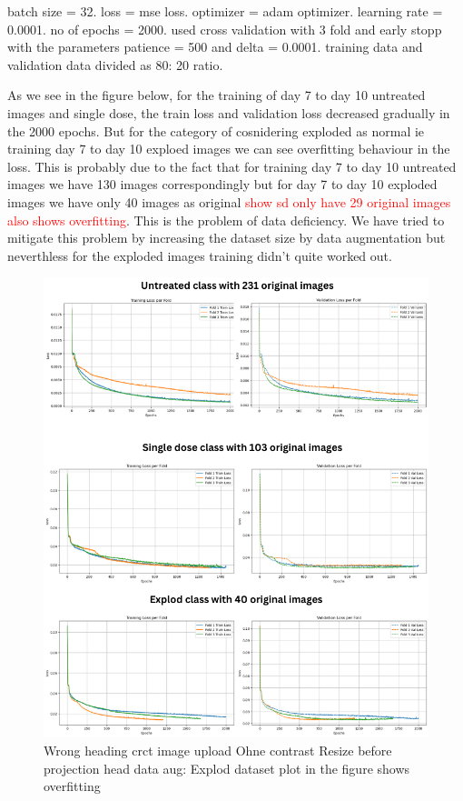 batch size = 32. loss = mse loss. optimizer = adam optimizer. learning rate = 0.0001. no of epochs = 2000. used cross validation with 3 fold and  early stopp with 
the parameters patience = 500 and delta = 0.0001. training data and validation data divided as 80: 20 ratio.

As we see in the figure below, for the training of day 7 to day 10 untreated images and single dose, the train loss and validation loss decreased gradually  in the 2000 epochs. But for the category of cosnidering exploded as normal ie training  day 7 to day 10 exploed images we can see overfitting behaviour in the loss. This is probably due to the fact that for training day 7 to day 10 untreated images we have 130 images correspondingly but for day 7 to day 10 exploded images we have only 40 images as original \textcolor{red}{show sd only have 29 original images also shows overfitting}. This is the problem of data deficiency. We have tried to mitigate this problem by increasing the dataset size by data augmentation but neverthless for the exploded images training didn't quite worked out.


\begin{figure}[H]
  \centering
  \includegraphics[scale=0.5]{figures/overfit.png} 
  \caption{Wrong heading crct image upload Ohne contrast Resize  before projection head data aug: Explod dataset plot in the figure shows overfitting }
  \label{fig:unloss}
\end{figure}




